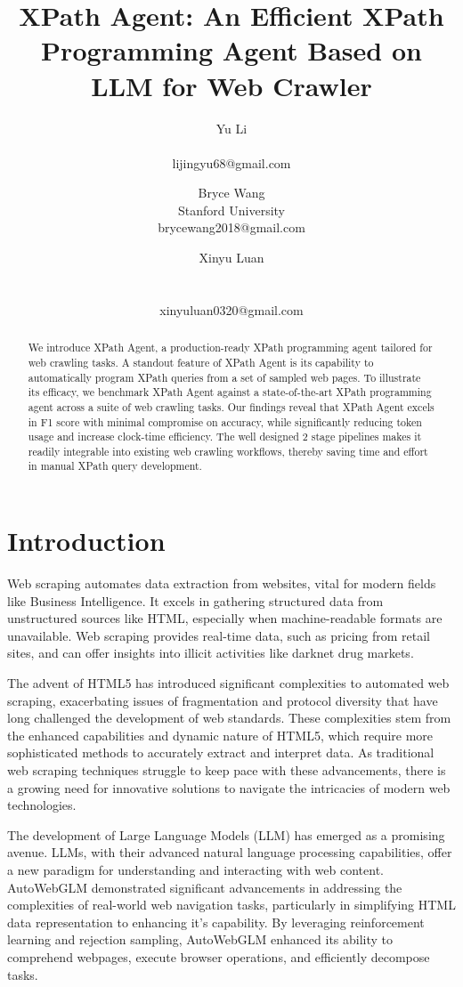 \documentclass[a4paper]{article}
\title{XPath Agent: An Efficient XPath Programming Agent Based on LLM for Web Crawler}
\author{
Yu Li \\ \\ lijingyu68@gmail.com
\and
Bryce Wang \\ Stanford University  \\ brycewang2018@gmail.com
\and
Xinyu Luan \\ \\ \\ xinyuluan0320@gmail.com
}
\begin{document}
\maketitle

\begin{abstract}
We introduce XPath Agent, a production-ready XPath programming agent tailored for web crawling tasks. A standout feature of XPath Agent is its capability to automatically program XPath queries from a set of sampled web pages. To illustrate its efficacy, we benchmark XPath Agent against a state-of-the-art XPath programming agent across a suite of web crawling tasks. Our findings reveal that XPath Agent excels in F1 score with minimal compromise on accuracy, while significantly reducing token usage and increase clock-time efficiency. The well designed 2 stage pipelines makes it readily integrable into existing web crawling workflows, thereby saving time and effort in manual XPath query development.
\end{abstract}

\section{Introduction}

Web scraping \cite{khder2021web} automates data extraction from websites, vital for modern fields like Business Intelligence. It excels in gathering structured data from unstructured sources like HTML, especially when machine-readable formats are unavailable. Web scraping provides real-time data, such as pricing from retail sites, and can offer insights into illicit activities like darknet drug markets.

The advent of HTML5 \cite{TABARES2021101529} has introduced significant complexities to automated web scraping, exacerbating issues of fragmentation and protocol diversity that have long challenged the development of web standards. These complexities stem from the enhanced capabilities and dynamic nature of HTML5, which require more sophisticated methods to accurately extract and interpret data. As traditional web scraping techniques struggle to keep pace with these advancements, there is a growing need for innovative solutions to navigate the intricacies of modern web technologies.

The development of Large Language Models (LLM) has emerged as a promising avenue. LLMs, with their advanced natural language processing capabilities, offer a new paradigm for understanding and interacting with web content. AutoWebGLM\cite{lai2024autowebglmlargelanguagemodelbased} demonstrated significant advancements in addressing the complexities of real-world web navigation tasks, particularly in simplifying HTML data representation to enhancing it's capability. By leveraging reinforcement learning and rejection sampling, AutoWebGLM enhanced its ability to comprehend webpages, execute browser operations, and efficiently decompose tasks.
\end{document}
